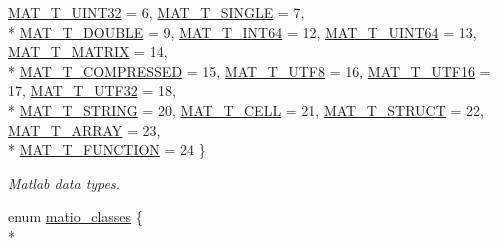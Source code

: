 \begin{DoxyCompactItemize}
\hyperlink{group__MAT_ggacf7b3b879282b7ab3a51190e49bf3453aa397e285a23fe240368b752897652c6a}{M\-A\-T\-\_\-\-T\-\_\-\-U\-I\-N\-T32} = 6, 
\hyperlink{group__MAT_ggacf7b3b879282b7ab3a51190e49bf3453a3a3657d40e9212c923d9b9d03531b64c}{M\-A\-T\-\_\-\-T\-\_\-\-S\-I\-N\-G\-L\-E} = 7, 
\\*
\hyperlink{group__MAT_ggacf7b3b879282b7ab3a51190e49bf3453a31e721ecf7e188196f83c32838288797}{M\-A\-T\-\_\-\-T\-\_\-\-D\-O\-U\-B\-L\-E} = 9, 
\hyperlink{group__MAT_ggacf7b3b879282b7ab3a51190e49bf3453a9e825b5d18b8f946eaf2b4b57e51c145}{M\-A\-T\-\_\-\-T\-\_\-\-I\-N\-T64} = 12, 
\hyperlink{group__MAT_ggacf7b3b879282b7ab3a51190e49bf3453a45547932c46be27118abe08302d7e29f}{M\-A\-T\-\_\-\-T\-\_\-\-U\-I\-N\-T64} = 13, 
\hyperlink{group__MAT_ggacf7b3b879282b7ab3a51190e49bf3453a32985fee89a4df8db4b3f5d3a48823d3}{M\-A\-T\-\_\-\-T\-\_\-\-M\-A\-T\-R\-I\-X} = 14, 
\\*
\hyperlink{group__MAT_ggacf7b3b879282b7ab3a51190e49bf3453a30437f2eb3becc2fa6e5d96599d7f724}{M\-A\-T\-\_\-\-T\-\_\-\-C\-O\-M\-P\-R\-E\-S\-S\-E\-D} = 15, 
\hyperlink{group__MAT_ggacf7b3b879282b7ab3a51190e49bf3453ac34ad81f5cbd3b7d0d95e57e5be0149b}{M\-A\-T\-\_\-\-T\-\_\-\-U\-T\-F8} = 16, 
\hyperlink{group__MAT_ggacf7b3b879282b7ab3a51190e49bf3453a87ffc0412143c326a1fcc759d5d81bdc}{M\-A\-T\-\_\-\-T\-\_\-\-U\-T\-F16} = 17, 
\hyperlink{group__MAT_ggacf7b3b879282b7ab3a51190e49bf3453a11e43c0e0be79b1983090e02ae583109}{M\-A\-T\-\_\-\-T\-\_\-\-U\-T\-F32} = 18, 
\\*
\hyperlink{group__MAT_ggacf7b3b879282b7ab3a51190e49bf3453a9456a83c0b22022af42461a09d63cdb2}{M\-A\-T\-\_\-\-T\-\_\-\-S\-T\-R\-I\-N\-G} = 20, 
\hyperlink{group__MAT_ggacf7b3b879282b7ab3a51190e49bf3453a07599cf2cca6d2b2d059378563318ba5}{M\-A\-T\-\_\-\-T\-\_\-\-C\-E\-L\-L} = 21, 
\hyperlink{group__MAT_ggacf7b3b879282b7ab3a51190e49bf3453a4f4d5a6e1d42c6aa81ffb810e5da5c85}{M\-A\-T\-\_\-\-T\-\_\-\-S\-T\-R\-U\-C\-T} = 22, 
\hyperlink{group__MAT_ggacf7b3b879282b7ab3a51190e49bf3453acf106b0c23021582375f59bc9fce89b1}{M\-A\-T\-\_\-\-T\-\_\-\-A\-R\-R\-A\-Y} = 23, 
\\*
\hyperlink{group__MAT_ggacf7b3b879282b7ab3a51190e49bf3453ae76686f267dd1641cd55dce306af6d10}{M\-A\-T\-\_\-\-T\-\_\-\-F\-U\-N\-C\-T\-I\-O\-N} = 24
 \}
\begin{DoxyCompactList}\small\item\em Matlab data types. \end{DoxyCompactList}\item 
enum \hyperlink{group__MAT_gad4d60ae7b709fc81bfd744fb4c857c40}{matio\-\_\-classes} \{ \\*

\end{DoxyCompactItemize}
